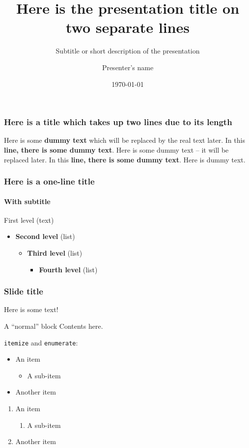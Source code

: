 \documentclass[english]{beamer}
\title[Here is the presentation title]{Here is the presentation title on two separate lines}
\subtitle{Subtitle or short description of the presentation}
\author{Presenter's name}
\date{\today}
\begin{document}
\begin{frame}
	\titlepage
\end{frame}

\begin{frame}
	\frametitle{Here is a title which takes up two lines due to its length}

	Here is some \textbf{dummy text} which will be replaced by the real text later.
	In this \textbf{line, there is some dummy text}.
	Here is some dummy text – it will be replaced later.
	In this \textbf{line, there is some dummy text}.
	Here is dummy text.
\end{frame}

\begin{frame}
	\frametitle{Here is a one-line title}
	\framesubtitle{With subtitle}

	First level (text)
	\begin{itemize}
		\item \textbf{Second level} (list)
		\begin{itemize}
			\item \textbf{Third level} (list)
			\begin{itemize}
				\item \textbf{Fourth level} (list)
			\end{itemize}
		\end{itemize}
	\end{itemize}
\end{frame}

\begin{frame}
	\frametitle{Slide title}

	Here is some text!

	\begin{block}{A “normal” block}
		Contents here.
	\end{block}

	\texttt{itemize} and \texttt{enumerate}:
	\begin{itemize}
		\item An item
		\begin{itemize}
			\item A sub-item
		\end{itemize}
		\item Another item
	\end{itemize}
	\begin{enumerate}
		\item An item
		\begin{enumerate}
			\item A sub-item
		\end{enumerate}
		\item Another item
	\end{enumerate}
\end{frame}
\end{document}
